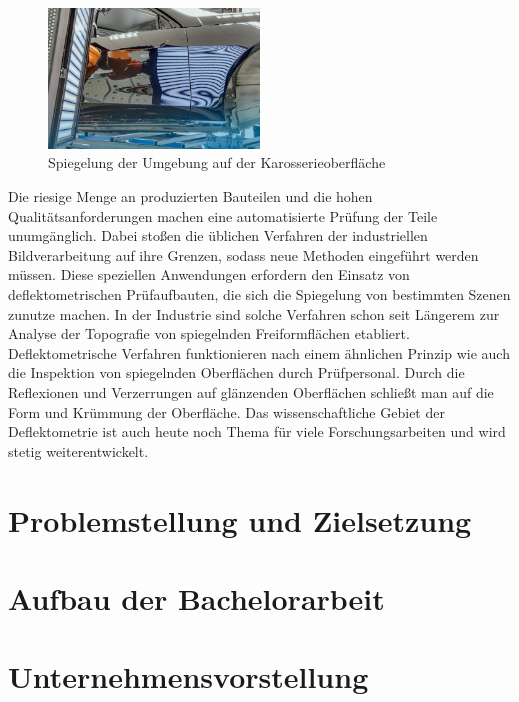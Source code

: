 {
	\begin{figure}[H]
		\centering
		\includegraphics[width=0.5\textwidth]{01_einfuehrung/figures/spiegelndeKarosserie}
		\caption[Spiegelnde Karosserieoberfläche]{Spiegelung der Umgebung auf der Karosserieoberfläche \cite{spiegelndeKarosserieImg}}
		\label{img:spiegelndeKarosserie}
	\end{figure}
}

\noindent
Die riesige Menge an produzierten Bauteilen und die hohen Qualitätsanforderungen machen eine automatisierte Prüfung der Teile unumgänglich.
Dabei stoßen die üblichen Verfahren der industriellen Bildverarbeitung auf ihre Grenzen, sodass neue Methoden eingeführt werden müssen.
Diese speziellen Anwendungen erfordern den Einsatz von deflektometrischen Prüfaufbauten, die sich die Spiegelung von bestimmten Szenen zunutze machen.
In der Industrie sind solche Verfahren schon seit Längerem zur Analyse der Topografie von spiegelnden Freiformflächen etabliert.
Deflektometrische Verfahren funktionieren nach einem ähnlichen Prinzip wie auch die Inspektion von spiegelnden Oberflächen durch Prüfpersonal. 
Durch die Reflexionen und Verzerrungen auf glänzenden Oberflächen schließt man auf die Form und Krümmung der Oberfläche.
Das wissenschaftliche Gebiet der Deflektometrie ist auch heute noch Thema für viele Forschungsarbeiten und wird stetig weiterentwickelt.

{
	\FloatBarrier
    \section{Problemstellung und Zielsetzung}
    \label{sec:problemstellung}
    
}

{
	\FloatBarrier
    \section{Aufbau der Bachelorarbeit}
    \label{sec:aufbauDerArbeit}
    
}

{
	\FloatBarrier
    \section{Unternehmensvorstellung}
    \label{sec:unternehmensvorstellung}
    
}